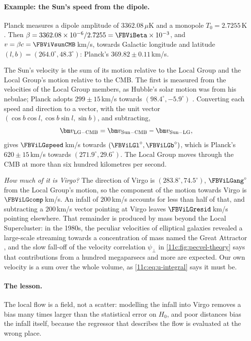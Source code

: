 \paragraph{Example: the Sun's speed from the dipole.} Planck measures a dipole
amplitude of $3362.08\,\mu$K and a monopole $T_0=2.7255$\,K \cite[Table~3]{Planck2018I}.
Then $\beta=3362.08\times10^{-6}/2.7255=\FBViBeta\times10^{-3}$, and
$v=\beta c=\FBViVsunCMB$\,km/s, towards Galactic longitude and latitude
$(l,b)=(264.0^\circ,48.3^\circ)$: Planck's $369.82\pm0.11$\,km/s.

The Sun's velocity is the sum of its motion relative to the Local Group and the
Local Group's motion relative to the CMB. The first is measured from the
velocities of the Local Group members, as Hubble's solar motion was from his
nebulae; Planck adopts $299\pm15$\,km/s towards $(98.4^\circ,-5.9^\circ)$
\cite[Table~3]{Planck2018I}. Converting each speed and direction to a vector, with
the unit vector $(\cos b\cos l,\cos b\sin l,\sin b)$, and subtracting,
\[
  \bm v_{\rm LG-CMB}=\bm v_{\rm Sun-CMB}-\bm v_{\rm Sun-LG},
\]
gives $\FBViLGspeed$\,km/s towards $(\FBViLGl^\circ,\FBViLGb^\circ)$, which is Planck's
$620\pm15$\,km/s towards $(271.9^\circ,29.6^\circ)$. The Local Group moves through the
CMB at more than six hundred kilometres per second.

\emph{How much of it is Virgo?} The direction of Virgo is $(283.8^\circ,74.5^\circ)$,
$\FBViLGang^\circ$ from the Local Group's motion, so the component of the motion
towards Virgo is $\FBViLGcomp$\,km/s. An infall of $200$\,km/s accounts for less than
half of that, and subtracting a $200$\,km/s vector pointing at Virgo leaves
$\FBViLGresid$\,km/s pointing elsewhere. That remainder is produced by mass beyond
the Local Supercluster: in the 1980s, the peculiar velocities of elliptical
galaxies revealed a large-scale streaming towards a concentration of mass named
the Great Attractor \cite{LyndenBell1988}, and the slow fall-off of the velocity
correlation $\psi_\perp$ in \cref{11c:fig:pecvel-theory} says that contributions from a
hundred megaparsecs and more are expected. Our own velocity is a sum over the
whole volume, as \eqref{11c:eq:u-integral} says it must be.

\paragraph{The lesson.} The local flow is a field, not a scatter: modelling the
infall into Virgo removes a bias many times larger than the statistical error on
$H_0$, and poor distances bias the infall itself, because the regressor that
describes the flow is evaluated at the wrong place.
